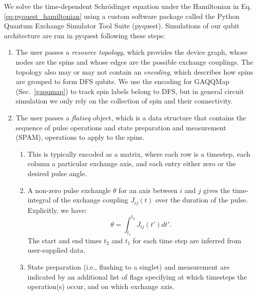 \documentclass[aps,prl,twocolumn,superscriptaddress,nobibnotes,10pt,floatfix]{revtex4-2}
\newcommand{\secref}[1]{Sec.~\ref{#1}}
\begin{document}
We solve the time-dependent Schrödinger equation under the Hamiltonian in Eq. \ref{eq:pyquest_hamiltonian} using a custom software package called the Python Quantum Exchange Simulator Tool Suite (pyquest).
Simulations of our qubit architecture are run in pyquest following these steps:

\begin{enumerate}
\def\labelenumi{\arabic{enumi}.}
\item
The user passes a \emph{resource topology}, which provides the device graph, whose nodes are the spins and whose edges are the possible exchange couplings.
The topology also may or may not contain an \emph{encoding}, which describes how spins are grouped to form DFS qubits.
We use the encoding for GAQQMap (\secref{gaqqmap}) to track spin labels belong to DFS, but in general circuit simulation we only rely on the collection of spin and their connectivity.
\item
The user passes a \emph{flatseq} object, which is a data structure that contains the sequence of pulse operations and state preparation and measurement (SPAM), operations to apply to the spins.

\begin{enumerate}
	\def\labelenumii{\alph{enumii}.}
	\item
	This is typically encoded as a matrix, where each row is a timestep, each column a particular exchange axis, and each entry either zero or the desired pulse angle.
	\item
	A non-zero pulse exchangle \(\theta\) for an axis between \(i\) and \(j\) gives the time-integral of the exchange coupling \(J_{ij}(t)\) over the duration of the pulse.
	Explicitly, we have: \emph{\hfill\break}\[\theta = \int_{t_{1}}^{t_{2}}{J_{ij}\left( t' \right) dt' }.\]
	The start and end times \(t_{2}\) and \(t_{1}\) for each time step are inferred from user-supplied data.

	\item
	State preparation (i.e., flushing to a singlet) and measurement are indicated by an additional list of flags specifying at which timesteps the operation(s) occur, and on which exchange axis.
\end{enumerate}


\end{enumerate}
\end{document}
